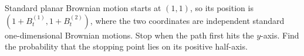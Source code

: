 Standard planar Brownian motion starts at $(1,1)$, so its position is $(1+B_t^{(1)},1+B_t^{(2)})$, where the two coordinates are independent standard one-dimensional Brownian motions. Stop when the path first hits the $y$-axis. Find the probability that the stopping point lies on its positive half-axis.
